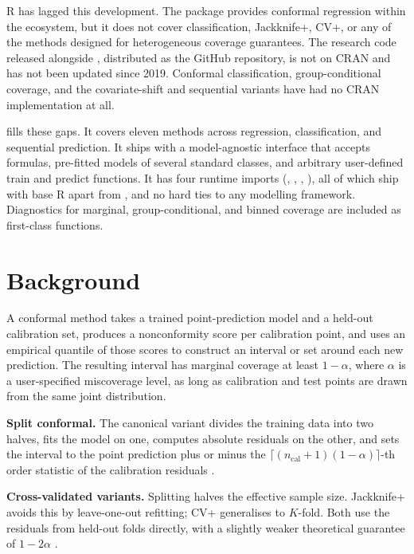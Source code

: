 R has lagged this development. The  package provides
conformal regression within the  ecosystem, but it does
not cover classification, Jackknife+, CV+, or any of the methods designed for
heterogeneous coverage guarantees. The research code released alongside
\citet{lei2018distribution}, distributed as the  GitHub
repository, is not on CRAN and has not been updated since 2019. Conformal
classification, group-conditional coverage, and the covariate-shift and
sequential variants have had no CRAN implementation at all.

 fills these gaps. It covers eleven methods across
regression, classification, and sequential prediction. It ships with a
model-agnostic interface that accepts formulas, pre-fitted models of several
standard classes, and arbitrary user-defined train and predict functions. It
has four runtime imports (, , ,
), all of which ship with base R apart from , and
no hard ties to any modelling framework. Diagnostics for marginal,
group-conditional, and binned coverage are included as first-class functions.

\section{Background}\label{background}

A conformal method takes a trained point-prediction model and a held-out
calibration set, produces a nonconformity score per calibration point, and
uses an empirical quantile of those scores to construct an interval or set
around each new prediction. The resulting interval has marginal coverage at
least \(1-\alpha\), where \(\alpha\) is a user-specified miscoverage level, as
long as calibration and test points are drawn from the same joint
distribution.

\textbf{Split conformal.} The canonical variant divides the training data into
two halves, fits the model on one, computes absolute residuals on the other,
and sets the interval to the point prediction plus or minus the
\(\lceil(n_{\text{cal}}+1)(1-\alpha)\rceil\)-th order statistic of the
calibration residuals \citep{lei2018distribution}.

\textbf{Cross-validated variants.} Splitting halves the effective sample size.
Jackknife+ avoids this by leave-one-out refitting; CV+ generalises to
\(K\)-fold. Both use the residuals from held-out folds directly, with a
slightly weaker theoretical guarantee of \(1-2\alpha\) \citep{barber2021predictive}.

